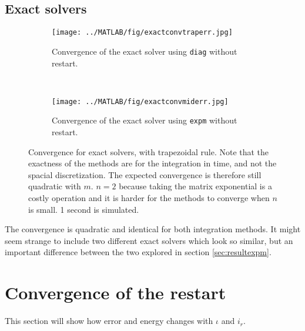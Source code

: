 \subsection{Exact solvers} %
\label{sec:exactconv}
\begin{figure}[H]
        \centering
        \begin{subfigure}[b]{0.45\textwidth}
                \texttt{[image: ../MATLAB/fig/exactconvtraperr.jpg]}
                \caption{ Convergence of the exact solver using \texttt{diag} without restart. }
                \label{fig:exactconvtraperr}
        \end{subfigure}
        ~
        \begin{subfigure}[b]{0.45\textwidth}
                \texttt{[image: ../MATLAB/fig/exactconvmiderr.jpg]}
                \caption{ Convergence of the exact solver using \texttt{expm} without restart. }  
				\label{fig:exactconvmiderr}
        \end{subfigure}         
       
\caption{Convergence for exact solvers, with trapezoidal rule. Note that the exactness of the methods are for the integration in time, and not the spacial discretization. The expected convergence is therefore still quadratic with $m$. $n = 2$ because taking the matrix exponential is a costly operation and it is harder for the methods to converge when $n$ is small. 1 second is simulated. } %
\label{fig:intexactt}
\end{figure}
The convergence is quadratic and identical for both integration methods. It might seem strange to include two different exact solvers which look so similar, but an important difference between the two explored in section \ref{sec:resultexpm}.

\section{Convergence of the restart}%
This section will show how error and energy changes with $\iota$ and $i_r$.
